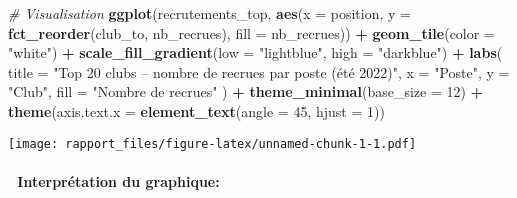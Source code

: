 \documentclass[
]{article}
\newenvironment{Shaded}{\begin{snugshade}}{\end{snugshade}}
\newcommand{\AttributeTok}[1]{\textcolor[rgb]{0.13,0.29,0.53}{#1}}
\newcommand{\CommentTok}[1]{\textcolor[rgb]{0.56,0.35,0.01}{\textit{#1}}}
\newcommand{\DecValTok}[1]{\textcolor[rgb]{0.00,0.00,0.81}{#1}}
\newcommand{\FunctionTok}[1]{\textcolor[rgb]{0.13,0.29,0.53}{\textbf{#1}}}
\newcommand{\NormalTok}[1]{#1}
\newcommand{\SpecialCharTok}[1]{\textcolor[rgb]{0.81,0.36,0.00}{\textbf{#1}}}
\newcommand{\StringTok}[1]{\textcolor[rgb]{0.31,0.60,0.02}{#1}}
\begin{document}
\begin{Shaded}
\begin{Highlighting}[]
\CommentTok{\# Visualisation }
\FunctionTok{ggplot}\NormalTok{(recrutements\_top, }\FunctionTok{aes}\NormalTok{(}\AttributeTok{x =}\NormalTok{ position, }\AttributeTok{y =} \FunctionTok{fct\_reorder}\NormalTok{(club\_to, nb\_recrues), }\AttributeTok{fill =}\NormalTok{ nb\_recrues)) }\SpecialCharTok{+}
  \FunctionTok{geom\_tile}\NormalTok{(}\AttributeTok{color =} \StringTok{"white"}\NormalTok{) }\SpecialCharTok{+}
  \FunctionTok{scale\_fill\_gradient}\NormalTok{(}\AttributeTok{low =} \StringTok{"lightblue"}\NormalTok{, }\AttributeTok{high =} \StringTok{"darkblue"}\NormalTok{) }\SpecialCharTok{+}
  \FunctionTok{labs}\NormalTok{(}
    \AttributeTok{title =} \StringTok{"Top 20 clubs – nombre de recrues par poste (été 2022)"}\NormalTok{,}
    \AttributeTok{x =} \StringTok{"Poste"}\NormalTok{,}
    \AttributeTok{y =} \StringTok{"Club"}\NormalTok{,}
    \AttributeTok{fill =} \StringTok{"Nombre de recrues"}
\NormalTok{  ) }\SpecialCharTok{+}
  \FunctionTok{theme\_minimal}\NormalTok{(}\AttributeTok{base\_size =} \DecValTok{12}\NormalTok{) }\SpecialCharTok{+}
  \FunctionTok{theme}\NormalTok{(}\AttributeTok{axis.text.x =} \FunctionTok{element\_text}\NormalTok{(}\AttributeTok{angle =} \DecValTok{45}\NormalTok{, }\AttributeTok{hjust =} \DecValTok{1}\NormalTok{))}
\end{Highlighting}
\end{Shaded}

\texttt{[image: rapport\_files/figure-latex/unnamed-chunk-1-1.pdf]}

\paragraph{🧠 Interprétation du
graphique:}\label{interpruxe9tation-du-graphique}
\end{document}
